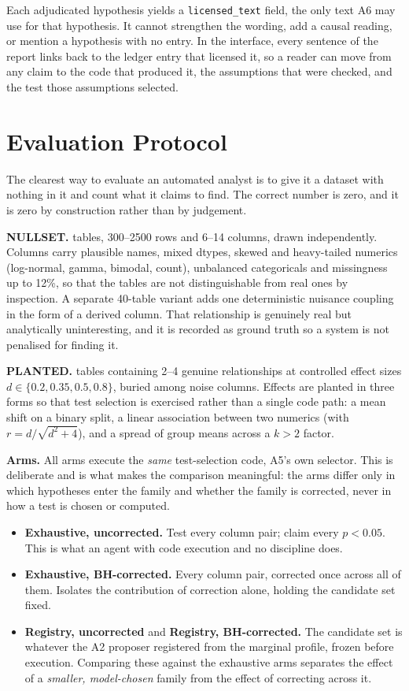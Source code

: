 \documentclass[10pt,twocolumn]{article}
\newcommand{\phead}[1]{\smallskip\noindent\textbf{#1.}\hspace{0.6em}\ignorespaces}
\begin{document}
Each adjudicated hypothesis yields a \texttt{licensed\_text} field, the only
text A6 may use for that hypothesis. It cannot strengthen the wording, add a
causal reading, or mention a hypothesis with no entry. In the interface, every
sentence of the report links back to the ledger entry that licensed it, so a
reader can move from any claim to the code that produced it, the assumptions
that were checked, and the test those assumptions selected.

\section{Evaluation Protocol}
\label{sec:protocol}

The clearest way to evaluate an automated analyst is to give it a dataset with
nothing in it and count what it claims to find. The correct number is zero, and
it is zero by construction rather than by judgement.

\phead{NULLSET} 200 tables, 300--2500 rows and 6--14 columns, drawn
independently. Columns carry plausible names, mixed dtypes, skewed and
heavy-tailed numerics (log-normal, gamma, bimodal, count), unbalanced
categoricals and missingness up to 12\%, so that the tables are not
distinguishable from real ones by inspection. A separate 40-table variant adds
one deterministic nuisance coupling in the form of a derived column. That
relationship is genuinely real but analytically uninteresting, and it is
recorded as ground truth so a system is not penalised for finding it.

\phead{PLANTED} 240 tables containing 2--4 genuine relationships at
controlled effect sizes $d \in \{0.2, 0.35, 0.5, 0.8\}$, buried among noise
columns. Effects are planted in three forms so that test selection is exercised
rather than a single code path: a mean shift on a binary split, a linear
association between two numerics (with $r = d/\sqrt{d^2+4}$), and a spread of
group means across a $k>2$ factor.

\phead{Arms} All arms execute the \emph{same} test-selection code, A5's
own selector. This is deliberate and is what makes the comparison meaningful:
the arms differ only in which hypotheses enter the family and whether the family
is corrected, never in how a test is chosen or computed.

\begin{itemize}\itemsep1pt
\item \textbf{Exhaustive, uncorrected.} Test every column pair; claim every
$p<0.05$. This is what an agent with code execution and no discipline does.
\item \textbf{Exhaustive, BH-corrected.} Every column pair, corrected once
across all of them. Isolates the contribution of correction alone, holding the
candidate set fixed.
\item \textbf{Registry, uncorrected} and \textbf{Registry, BH-corrected.} The
candidate set is whatever the A2 proposer registered from the marginal profile,
frozen before execution. Comparing these against the exhaustive arms separates
the effect of a \emph{smaller, model-chosen} family from the effect of
correcting across it.
\end{itemize}
\end{document}
